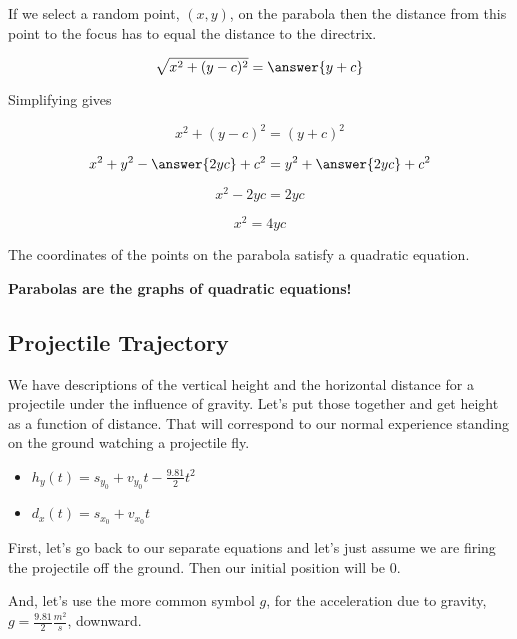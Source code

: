 \documentclass{ximera}
\begin{document}
\begin{idea}
If we select a random point, $(x,y)$, on the parabola then the distance from this point to the focus has to equal the distance to the directrix.


\[  \sqrt{x^2 + (y-c)^2} = \answer{y+c}   \]


Simplifying gives


\[  x^2 + (y-c)^2 = (y+c)^2   \]

\[  x^2 + y^2 - \answer{2 y c} + c^2 = y^2 + \answer{2 y c} + c^2   \]

\[  x^2  - 2 y c  =  2 y c    \]

\[  x^2   =  4 y c    \]


The coordinates of the points on the parabola satisfy a quadratic equation.  


\begin{center}
\textbf{\textcolor{red!80!black}{Parabolas are the graphs of quadratic equations!}}
\end{center}


\end{idea}








\subsection*{Projectile Trajectory}


We have descriptions of the vertical height and the horizontal distance for a projectile under the influence of gravity.  Let's put those together and get height as a function of distance.  That will correspond to our normal experience standing on the ground watching a projectile fly.


\begin{itemize}
\item $h_y(t) = s_{y_0} + v_{y_0} t - \frac{9.81}{2} t^2$


\item $d_x(t) = s_{x_0} + v_{x_0} t$
\end{itemize}




First, let's go back to our separate equations and let's just assume we are firing the projectile off the ground.  Then our initial position will be $0$.  

And, let's use the more common symbol $g$, for the acceleration due to gravity, $g = \frac{9.81}{2} \frac{m^2}{s}$, downward.
\end{document}
